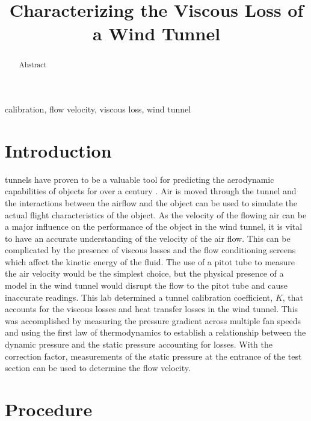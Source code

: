 \documentclass[journal,letterpaper]{IEEEtran}
\begin{document}
\title{Characterizing the Viscous Loss of a Wind Tunnel}

\author{
}

\maketitle
\thispagestyle{empty}

\begin{abstract}
Abstract
\end{abstract}

\begin{IEEEkeywords}
calibration, flow velocity, viscous loss, wind tunnel
\end{IEEEkeywords}


\section{Introduction}


 tunnels have proven to be a valuable tool for predicting the aerodynamic capabilities of objects for over a century \cite{lecture}.
Air is moved through the tunnel and the interactions between the airflow and the object can be used to simulate the actual flight characteristics of the object.
As the velocity of the flowing air can be a major influence on the performance of the object in the wind tunnel, it is vital to have an accurate understanding of the velocity of the air flow.
This can be complicated by the presence of viscous losses and the flow conditioning screens which affect the kinetic energy of the fluid.
The use of a pitot tube to measure the air velocity would be the simplest choice, but the physical presence of a model in the wind tunnel would disrupt the flow to the pitot tube and cause inaccurate readings.
This lab determined a tunnel calibration coefficient, $K$, that accounts for the viscous losses and heat transfer losses in the wind tunnel.
This was accomplished by measuring the pressure gradient across multiple fan speeds and using the first law of thermodynamics to establish a relationship between the dynamic pressure and the static pressure accounting for losses.
With the correction factor, measurements of the static pressure at the entrance of the test section can be used to determine the flow velocity.


\section{Procedure}
\end{document}

